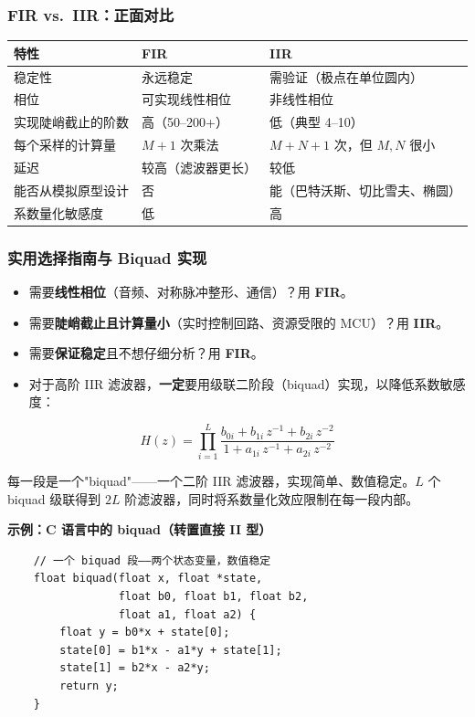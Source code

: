 \subsubsection{FIR vs.\ IIR：正面对比}

\begin{center}
\begin{tabular}{lll}
\toprule
\textbf{特性} & \textbf{FIR} & \textbf{IIR} \\
\midrule
稳定性 & 永远稳定 & 需验证（极点在单位圆内） \\
相位 & 可实现线性相位 & 非线性相位 \\
实现陡峭截止的阶数 & 高（50--200+） & 低（典型 4--10） \\
每个采样的计算量 & $M+1$ 次乘法 & $M+N+1$ 次，但 $M,N$ 很小 \\
延迟 & 较高（滤波器更长） & 较低 \\
能否从模拟原型设计 & 否 & 能（巴特沃斯、切比雪夫、椭圆） \\
系数量化敏感度 & 低 & 高 \\
\bottomrule
\end{tabular}
\end{center}

\subsubsection{实用选择指南与 Biquad 实现}

\begin{itemize}
    \item 需要\textbf{线性相位}（音频、对称脉冲整形、通信）？用 \textbf{FIR}。
    \item 需要\textbf{陡峭截止且计算量小}（实时控制回路、资源受限的 MCU）？用 \textbf{IIR}。
    \item 需要\textbf{保证稳定}且不想仔细分析？用 \textbf{FIR}。
    \item 对于高阶 IIR 滤波器，\textbf{一定}要用级联二阶段（biquad）实现，以降低系数敏感度：
\end{itemize}
\begin{equation}
H(z) = \prod_{i=1}^{L}
       \frac{b_{0i} + b_{1i}\,z^{-1} + b_{2i}\,z^{-2}}
            {1   + a_{1i}\,z^{-1} + a_{2i}\,z^{-2}}
\end{equation}

每一段是一个"biquad"——一个二阶 IIR 滤波器，实现简单、数值稳定。$L$ 个 biquad 级联得到 $2L$ 阶滤波器，同时将系数量化效应限制在每一段内部。

\textbf{示例：C 语言中的 biquad（转置直接 II 型）}
\begin{verbatim}
    // 一个 biquad 段——两个状态变量，数值稳定
    float biquad(float x, float *state,
                 float b0, float b1, float b2,
                 float a1, float a2) {
        float y = b0*x + state[0];
        state[0] = b1*x - a1*y + state[1];
        state[1] = b2*x - a2*y;
        return y;
    }
\end{verbatim}

